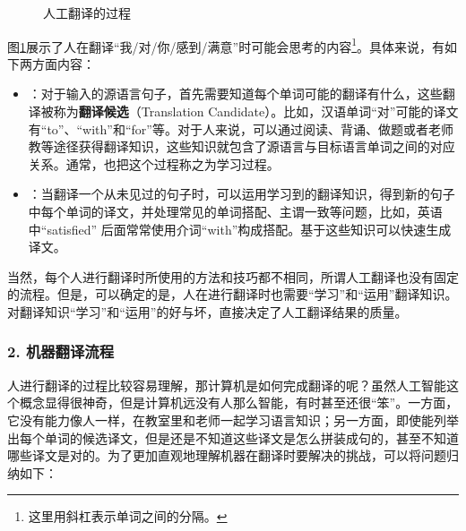 \begin{figure}[htp]
    \centering

    \caption{人工翻译的过程}
    \label{fig:5-3}
\end{figure}
\vspace{-0.2em}

\parinterval 图\ref{fig:5-3}展示了人在翻译“我/对/你/感到/满意”时可能会思考的内容\footnote{这里用斜杠表示单词之间的分隔。}。具体来说，有如下两方面内容：

\begin{itemize}
\vspace{0.5em}
\item {\small{}}：对于输入的源语言句子，首先需要知道每个单词可能的翻译有什么，这些翻译被称为{\small\sffamily\bfseries{翻译候选}}（Translation Candidate）。比如，汉语单词“对”可能的译文有“to”、“with”和“for”等。对于人来说，可以通过阅读、背诵、做题或者老师教等途径获得翻译知识，这些知识就包含了源语言与目标语言单词之间的对应关系。通常，也把这个过程称之为学习过程。
\vspace{0.5em}
\item {\small{}}：当翻译一个从未见过的句子时，可以运用学习到的翻译知识，得到新的句子中每个单词的译文，并处理常见的单词搭配、主谓一致等问题，比如，英语中“satisfied” 后面常常使用介词“with”构成搭配。基于这些知识可以快速生成译文。
\vspace{0.5em}
\end{itemize}

当然，每个人进行翻译时所使用的方法和技巧都不相同，所谓人工翻译也没有固定的流程。但是，可以确定的是，人在进行翻译时也需要“学习”和“运用”翻译知识。对翻译知识“学习”和“运用”的好与坏，直接决定了人工翻译结果的质量。


\subsubsection{2. 机器翻译流程}

\parinterval 人进行翻译的过程比较容易理解，那计算机是如何完成翻译的呢？虽然人工智能这个概念显得很神奇，但是计算机远没有人那么智能，有时甚至还很“笨”。一方面，它没有能力像人一样，在教室里和老师一起学习语言知识；另一方面，即使能列举出每个单词的候选译文，但是还是不知道这些译文是怎么拼装成句的，甚至不知道哪些译文是对的。为了更加直观地理解机器在翻译时要解决的挑战，可以将问题归纳如下：

